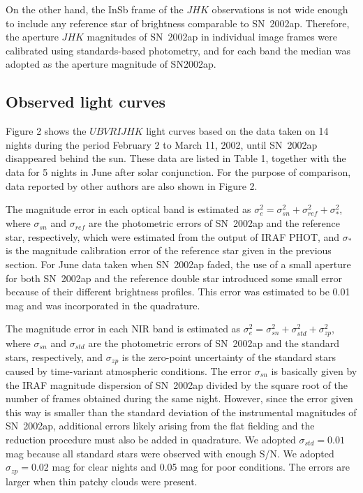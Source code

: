 \documentclass[10pt,preprint2]{aastex}
\begin{document}
On the other hand, the InSb frame of the $JHK$ observations is
not wide enough to include any reference star of brightness
comparable to SN~2002ap. Therefore, the aperture $JHK$ magnitudes
of SN~2002ap in individual image frames were calibrated using
standards-based photometry, and for each band the median was
adopted as the aperture magnitude of SN2002ap.

\subsection{Observed light curves}

Figure 2 shows the $UBVRIJHK$ light curves based on the data taken
on 14 nights during the period February 2 to March 11, 2002,
until SN~2002ap disappeared behind the sun.
These data are listed in Table 1, together with the data for 5
nights in June after solar conjunction. For the purpose of
comparison, data reported by other authors are also shown in Figure 2.

The magnitude error in each optical band is estimated as
$\sigma_e^2=\sigma_{sn}^2+\sigma_{ref}^2+\sigma_*^2$, where
$\sigma_{sn}$ and $\sigma_{ref}$ are the photometric errors of
SN~2002ap and the reference star, respectively, which were
estimated from the output of IRAF PHOT, and $\sigma_*$ is the
magnitude calibration error of the reference star given in the
previous section.  For June data taken when SN~2002ap faded, the
use of a small aperture for both SN~2002ap and the reference
double star introduced some small error because of their different
brightness profiles.  This error was estimated to be 0.01 mag and
was incorporated in the quadrature.

The magnitude error in each NIR band is estimated as
$\sigma_e^2=\sigma_{sn}^2+\sigma_{std}^2+\sigma_{zp}^2$, where
$\sigma_{sn}$ and $\sigma_{std}$ are the photometric errors of
SN~2002ap and the standard stars, respectively, and $\sigma_{zp}$
is the zero-point uncertainty of the standard stars caused by
time-variant atmospheric conditions. The error $\sigma_{sn}$ is
basically given by the IRAF magnitude dispersion of SN~2002ap
divided by the square root of the number of frames obtained during
the same night.  However, since the error given this way is
smaller than the standard deviation of the instrumental magnitudes
of SN~2002ap, additional errors likely arising from the flat
fielding and the reduction procedure must also be added in
quadrature. We adopted $\sigma_{std}=0.01$ mag because all
standard stars were observed with enough S/N.  We adopted
$\sigma_{zp}=0.02$ mag for clear nights and 0.05 mag for poor
conditions. The errors are larger when thin patchy clouds were
present.
\end{document}
